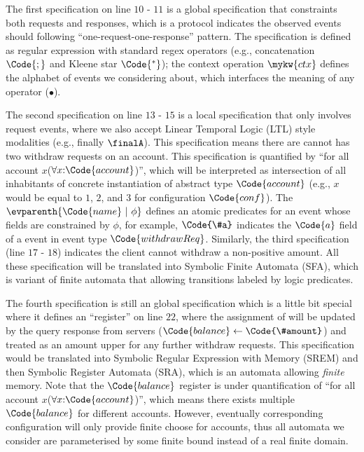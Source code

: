 The first specification on line $10$ - $11$ is a global specification that constraints both requests and responses, which is a protocol indicates the observed events should following ``one-request-one-response'' pattern. The specification is defined as regular expression with standard regex operators (e.g., concatenation $\Code{;}$ and Kleene star $\Code{^*}$); the context operation $\mykw{ctx}$ defines the alphabet of events we considering about, which interfaces the meaning of any operator ($\bullet$). 

The second specification on line $13$ - $15$ is a local specification that only involves request events, where we also accept Linear Temporal Logic (LTL) style modalities (e.g., finally $\finalA$). This specification means there are cannot has two withdraw requests on an account. This specification is quantified by ``for all account $x$($\forall x{:}\Code{account}$)'', which will be interpreted as intersection of all inhabitants of concrete instantiation of abstract type $\Code{account}$ (e.g., $x$ would be equal to $1$, $2$, and $3$ for configuration $\Code{conf}$). The $\evparenth{\Code{name}~|~ \phi }$ defines an atomic predicates for an event  whose fields are constrained by $\phi$, for example, $\Code{\#a}$ indicates the $\Code{a}$ field of a event in event type $\Code{withdrawReq}$. Similarly, the third specification (line $17$ - $18$) indicates the client cannot withdraw a non-positive amount. All these specification will be translated into Symbolic Finite Automata (SFA)\cite{SFA-Transducers}, which is variant of finite automata that allowing transitions labeled by logic predicates. 

The fourth specification is still an global specification which is a little bit special where it defines an ``register''  on line $22$, where the assignment of  will be updated by the query response from servers ($\Code{balance} \leftarrow \Code{\#amount}$) and treated as an amount upper for any further withdraw requests. This specification would be translated into Symbolic Regular Expression with Memory (SREM)\cite{SREM} and then Symbolic Register Automata (SRA)\cite{SRA}, which is an automata allowing \emph{finite} memory. Note that the $\Code{balance}$ register is under quantification of ``for all account $x$($\forall x{:}\Code{account}$)'', which means there exists multiple $\Code{balance}$ for different accounts. However, eventually corresponding configuration will only provide finite choose for accounts, thus all automata we consider are parameterised by some finite bound instead of a real finite domain.

